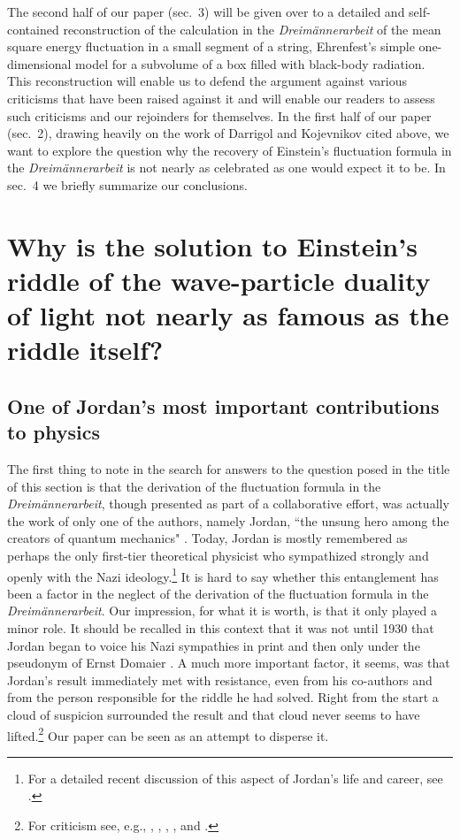 \documentclass{elsart}
\begin{document}
The second half of our paper (sec.\ 3) will be given over to a detailed and self-contained reconstruction of the calculation in the {\it Dreim\"annerarbeit}  of the mean square energy fluctuation in a small segment of a string, Ehrenfest's simple one-dimensional model for a subvolume of a box filled with black-body radiation. This reconstruction will enable us to defend the argument against various criticisms that have been raised against it and will enable our readers to assess such criticisms and our rejoinders for themselves. 
In the first half of our paper (sec.\ 2), drawing heavily on the work of Darrigol and Kojevnikov cited above, we want to explore the question why the recovery of Einstein's fluctuation formula in the {\it Dreim\"annerarbeit} is not nearly as celebrated as one would expect it to be. In sec.\ 4 we briefly summarize our conclusions. 

\section{Why is the solution to Einstein's riddle of the wave-particle duality of light not nearly as famous as the riddle itself?}  

\subsection{One of Jordan's most important contributions to physics}

The first thing to note in the search for answers to the question posed in the title of this section is  
that the derivation of the fluctuation formula in the {\it Dreim\"annerarbeit}, though presented as part of a collaborative effort, was actually the work of only one of the authors, namely Jordan, ``the unsung hero among the creators of quantum mechanics" \citep[p.\ 5]{Schweber 1994}. Today, Jordan is mostly remembered as perhaps the only first-tier theoretical physicist  who sympathized strongly and openly with the Nazi ideology.\footnote{\label{nazi}For a detailed recent discussion of this aspect of Jordan's life and career, see \citep{Hoffmann and Walker 2007}.} It is hard to say whether this entanglement has been a factor in the neglect of the derivation of the fluctuation formula in the {\it Dreim\"annerarbeit}.
Our impression, for what it is worth, is that it only played a minor role.
It should be recalled in this context that it was not until 1930 that Jordan began to voice his Nazi sympathies in print and then only under the pseudonym of Ernst Domaier \citep[p.\ 71]{Beyler 2007}. A much more important factor, it seems, was that Jordan's result immediately met with resistance, even from his co-authors and from the person responsible for the riddle he had solved. 
Right from the start a cloud of  suspicion surrounded the result and that cloud never seems to have lifted.\footnote{For criticism see, e.g., \citep{Smekal 1926}, \citep{Heisenberg 1931}, \citep{Born and Fuchs 1939a}, \citep{Gonzalez and Wergeland 1973}, and \citep{Bach 1989}.}  Our paper can be seen as an attempt to disperse it.
\end{document}
